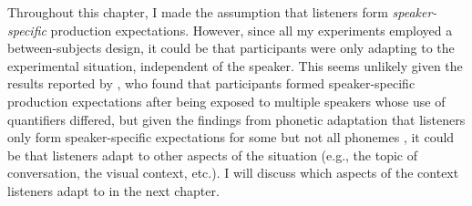 

Throughout this chapter, I made the assumption that listeners  form \textit{speaker-specific} production expectations. However,
since all my experiments employed a between-subjects design, it could be that participants were only adapting to the experimental
situation, independent of the speaker. This seems unlikely given the results reported by \textcite{Yildirim2016}, who found that
participants formed speaker-specific production expectations after being exposed to multiple speakers whose use of
quantifiers differed, but given the findings from phonetic adaptation that listeners only form speaker-specific expectations
for some but not all phonemes \cite{Kraljic2006}, it could be that listeners adapt to other aspects of the situation (e.g., the topic of conversation, the visual context, etc.).
I will discuss which aspects of the context listeners adapt to in the next chapter.

